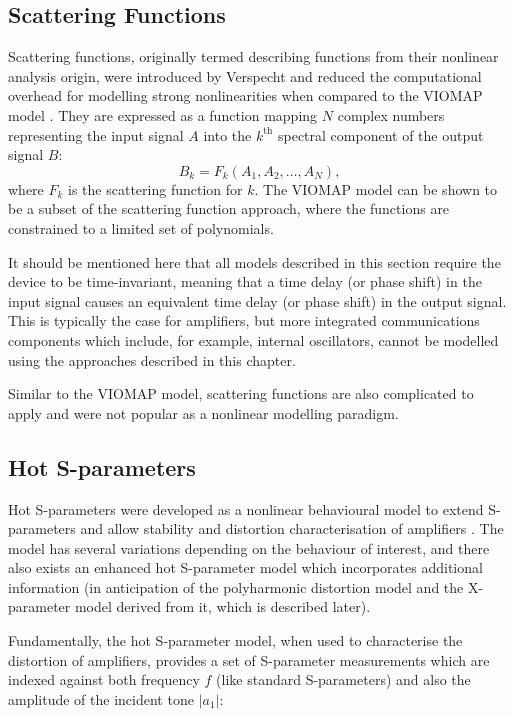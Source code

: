 \documentclass[../thesis/thesis.tex]{subfiles}
\begin{document}
\subsection{Scattering Functions}

Scattering functions, originally termed describing functions from their nonlinear analysis origin, were introduced by Verspecht and reduced the computational overhead for modelling strong nonlinearities when compared to the VIOMAP model \cite{Verspecht_1996}. They are expressed as a function mapping $N$ complex numbers representing the input signal $A$ into the $k^{\textrm{th}}$ spectral component of the output signal $B$:
\begin{equation}
	B_{k} = F_k(A_1, A_2, \dots, A_N),
	\label{ch5_eqn_scatfunc}
\end{equation}
where $F_k$ is the scattering function for $k$. The VIOMAP model can be shown to be a subset of the scattering function approach, where the functions are constrained to a limited set of polynomials.

It should be mentioned here that all models described in this section require the device to be time-invariant, meaning that a time delay (or phase shift) in the input signal causes an equivalent time delay (or phase shift) in the output signal. This is typically the case for amplifiers, but more integrated communications components which include, for example, internal oscillators, cannot be modelled using the approaches described in this chapter.

Similar to the VIOMAP model, scattering functions are also complicated to apply and were not popular as a nonlinear modelling paradigm.

\subsection{Hot S-parameters}

Hot S-parameters were developed as a nonlinear behavioural model to extend S-parameters and allow stability and distortion characterisation of amplifiers \cite{Verspecht_2002, Verspecht_2005}. The model has several variations depending on the behaviour of interest, and there also exists an enhanced hot S-parameter model which incorporates additional information (in anticipation of the polyharmonic distortion model and the X-parameter model derived from it, which is described later).

Fundamentally, the hot S-parameter model, when used to characterise the distortion of amplifiers, provides a set of S-parameter measurements which are indexed against both frequency $f$ (like standard S-parameters) and also the amplitude of the incident tone $|a_1|$:
\end{document}
